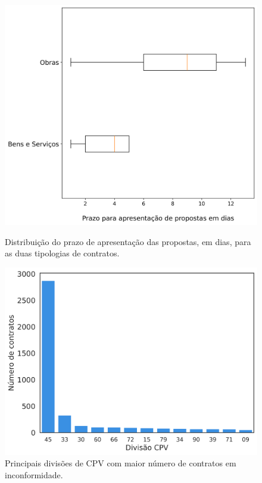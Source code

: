 \begin{figure}[H]
	\centering
	\begin{minipage}{.48\linewidth}
		\includegraphics[width=\linewidth]{imagens/r003/boxplot_prazos.png}
		\caption{Distribuição do prazo de apresentação das propostas, em dias, para as duas tipologias de contratos.}
		\label{fig:minday}
	\end{minipage}
	\hfill
	\begin{minipage}{.48\linewidth}
		\includegraphics[width=\linewidth]{imagens/r003/main_cpvs.png}
		\caption{Principais divisões de CPV com maior número de contratos em inconformidade.}
		
	\end{minipage}
\end{figure}













